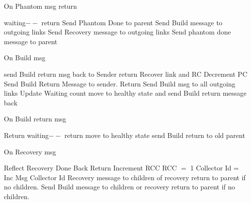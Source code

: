 \documentclass{article}
\begin{document}
	
\begin{algorithm}
\caption{On Phantom msg return}
\label{Phantom Done message received}
\begin{algorithmic}[1]
\State waiting$--$
\State return
\EndIf
{}
\State Send Phantom Done to parent
\State Send Build message to outgoing links
\State Send Recovery message to outgoing links
\Else
\State Send phantom done message to parent
\EndIf
\EndProcedure
\end{algorithmic}
\end{algorithm}	


	
\begin{algorithm}
\caption{On Build msg}
\label{Build message received}
\begin{algorithmic}[1]
\State send Build return msg back to Sender
\State return
\EndIf
\State Recover link and RC
\State Decrement PC
\State Send Build Return Message to sender.
\State Return
\EndIf
\State Send Build msg to all outgoing links
\State Update Waiting count
\State move to healthy state and send Build return message back
\EndIf
\EndProcedure
\end{algorithmic}
\end{algorithm}	



\begin{algorithm}
\caption{On Build return msg}
\label{Build return message received}
\begin{algorithmic}[1]
\State Return
\EndIf
\State waiting$--$
\State return
\EndIf
\State move to healthy state
\State send Build return to old parent
\EndIf
\EndProcedure
\end{algorithmic}
\end{algorithm}	


\begin{algorithm}
\caption{On Recovery msg}
\label{Recovery message received}
\begin{algorithmic}[1]
\State Reflect Recovery Done Back
\State Return
\State Increment RCC
\Else
\State RCC $=$ 1
\State Collector Id = Inc Msg Collector Id
\EndIf
{}
\State Recovery message to children of recovery return to parent if no children.
\EndIf
{} 
\State Send Build message to children or recovery return to parent if no children.
\EndIf
\EndProcedure
\end{algorithmic}
\end{algorithm}	
\end{document}
